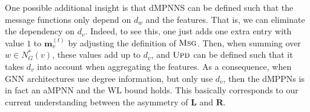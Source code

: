 \smallskip
\noindent
\leftpointright
One possible additional insight is that dMPNNS can be defined such that
the message functions  only depend on $d_w$ and the features. That is, we 
can eliminate the dependency on $d_v$.
Indeed, to see this, one just adds one extra entry with value $1$ to $\mathbf{m}_v^{(t)}$ by adjusting the definition of $\textsc{Msg}$. Then, when summing over
$w\in N_G^*(v)$, these values add up to $d_v$, and $\textsc{Upd}$ can be defined such that it takes $d_v$ into account when aggregating the features. 
As a consequence, when GNN architectures use degree information, but only use $d_v$, then the dMPPNs is in fact an aMPNN and the WL bound holds. This basically corresponds to our current understanding between the asymmetry of $\mathbf{L}$ and $\mathbf{R}$. 












